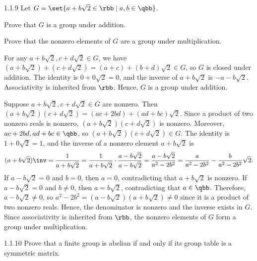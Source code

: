 \begin{exercise}{1.1.9}
    Let $G = \set{ a + b\sqrt{2} \in \rbb \mid a, b \in \qbb }$.
    \begin{subexercises}
        \item Prove that $G$ is a group under addition.
        \item Prove that the nonzero elements of $G$ are a group under multiplication.
    \end{subexercises}
\end{exercise}

\begin{solenum}
    \item For any $a + b\sqrt{2}, c + d\sqrt{2} \in G$, we have $ (a + b\sqrt{2}) + (c + d\sqrt{2}) = (a + c) + (b + d)\sqrt{2} \in G$, so $G$ is closed under addition.
	The identity is $0 + 0\sqrt 2 = 0$, and the inverse of $a + b\sqrt 2$ is $-a - b\sqrt 2$.
	Associativity is inherited from $\rbb$.
	Hence, $G$ is a group under addition.
    \item Suppose $a + b\sqrt{2}, c + d\sqrt{2} \in G$ are nonzero.
    Then $(a + b\sqrt 2)(c + d\sqrt 2) = (ac + 2bd) + (ad + bc)\sqrt{2}$.
    Since a product of two nonzero reals is nonzero, $(a + b\sqrt 2)(c + d\sqrt 2)$ is nonzero.
    Moreover, $ac + 2bd, ad + bc \in \qbb$, so $(a + b\sqrt 2)(c + d\sqrt 2) \in G$.
	The identity is $1 + 0\sqrt 2 = 1$, and the inverse of a nonzero element $a + b\sqrt 2$ is
    \[
    	(a + b\sqrt 2)\inv = \frac{1}{a + b\sqrt 2} = \frac{1}{a + b\sqrt 2} \cdot \frac{a - b\sqrt 2}{a - b\sqrt 2} = \frac{a - b\sqrt 2}{a^2 - 2b^2} = \frac a{a^2 - 2b^2} - \frac b{a^2 - 2b^2}\sqrt 2.
    \]
    If $a - b\sqrt{2} = 0$ and $b = 0$, then $a = 0$, contradicting that $a + b\sqrt{2}$ is nonzero.
    If $a - b\sqrt{2} = 0$ and $b \neq 0$, then $a = b\sqrt{2}$, contradicting that $a \in \qbb$.
    Therefore, $a - b\sqrt{2} \neq 0$, so $a^2 - 2b^2 = (a - b\sqrt{2})(a + b\sqrt{2}) \neq 0$ since it is a product of two nonzero reals.
    Hence, the denominator is nonzero and the inverse exists in $G$.
    Since associativity is inherited from $\rbb$, the nonzero elements of $G$ form a group under multiplication.
\end{solenum}

\begin{exercise}{1.1.10}
    Prove that a finite group is abelian if and only if its group table is a symmetric matrix.
\end{exercise}

